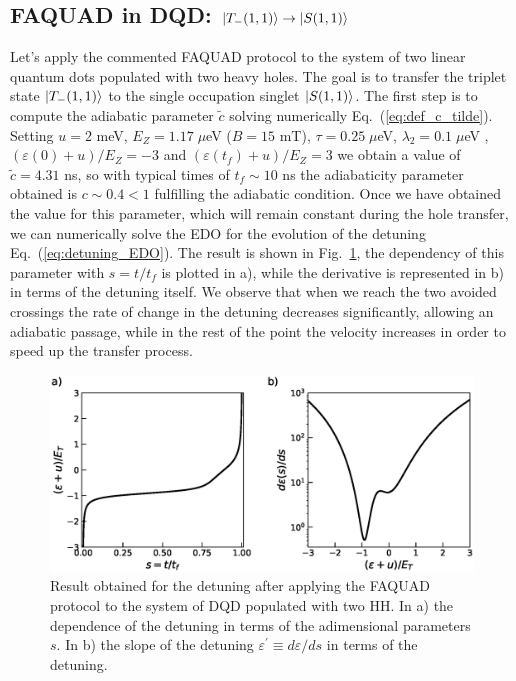 \documentclass[a4paper,11pt]{article}
\begin{document}
\subsection{FAQUAD in DQD: $\ket{T_-(1,1)}\rightarrow\ket{S(1,1)}$}
Let's apply the commented FAQUAD protocol to the system of two linear quantum dots populated with two heavy holes. The goal is to transfer the triplet state $\ket{T_-(1,1)}$ to the single occupation singlet $\ket{S(1,1)}$. The first step is to compute the adiabatic parameter $\tilde{c}$ solving numerically Eq.~(\ref{eq:def_c_tilde}). Setting $u=2$ meV, $E_Z=1.17\; \mu$eV ($B=15$ mT), $\tau=0.25 \; \mu$eV, $\lambda_2=0.1\; \mu$eV , $(\varepsilon(0)+u)/E_Z=-3$ and $(\varepsilon(t_f)+u)/E_Z=3$ we obtain a value of $\tilde{c}=4.31$ ns, so with typical times of $t_f\sim 10$ ns the adiabaticity parameter obtained is $c\sim 0.4< 1$ fulfilling the adiabatic condition. Once we have obtained the value for this parameter, which will remain constant during the hole transfer, we can numerically solve the EDO for the evolution of the detuning Eq.~(\ref{eq:detuning_EDO}). The result is shown in Fig.~\ref{fig:FAQUAD_detuning_2QD_2HH}, the dependency of this parameter with $s=t/t_f$ is plotted in a), while the derivative is represented in b) in terms of the detuning itself. We observe that when we reach the two avoided crossings the rate of change in the detuning decreases significantly, allowing an adiabatic passage, while in the rest of the point the velocity increases in order to speed up the transfer process.
\begin{figure}[!htbp]
	\centering
	\includegraphics[width=1\linewidth]{FAQUAD_detuning_2QD_2HH.eps}
	\caption{Result obtained for the detuning after applying the FAQUAD protocol to the system of DQD populated with two HH. In a) the dependence of the detuning in terms of the adimensional parameters $s$. In b) the slope of the detuning $\varepsilon^\prime\equiv d \varepsilon/d s$ in terms of the detuning.}
	\label{fig:FAQUAD_detuning_2QD_2HH}
\end{figure}\\
\end{document}
